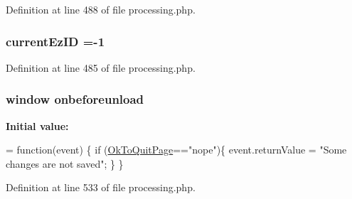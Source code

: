 Definition at line 488 of file processing.\-php.

\hypertarget{processing_8php_aa7b648ce9374344019d30469fd37c30e}{
\subsubsection[{current\-Ez\-I\-D}]{\setlength{\rightskip}{0pt plus 5cm}current\-Ez\-I\-D =-\/1}}\label{processing_8php_aa7b648ce9374344019d30469fd37c30e}


Definition at line 485 of file processing.\-php.

\hypertarget{processing_8php_a12dd03abd8fa9daa2fe8eaeb9c9682c3}{
\subsubsection[{onbeforeunload}]{\setlength{\rightskip}{0pt plus 5cm}window onbeforeunload}}\label{processing_8php_a12dd03abd8fa9daa2fe8eaeb9c9682c3}
{\bfseries Initial value\-:}
\begin{DoxyCode}
= \textcolor{keyword}{function}(event) \{
    \textcolor{keywordflow}{if} (\hyperlink{obsolete_2processing__bak_8php_a737a9dd58b5139e64ee8903b481e9aa8}{OkToQuitPage}==\textcolor{stringliteral}{"nope"})\{
        \textcolor{keyword}{event}.returnValue = \textcolor{stringliteral}{"Some changes are not saved"};
    \}
\}
\end{DoxyCode}


Definition at line 533 of file processing.\-php.

